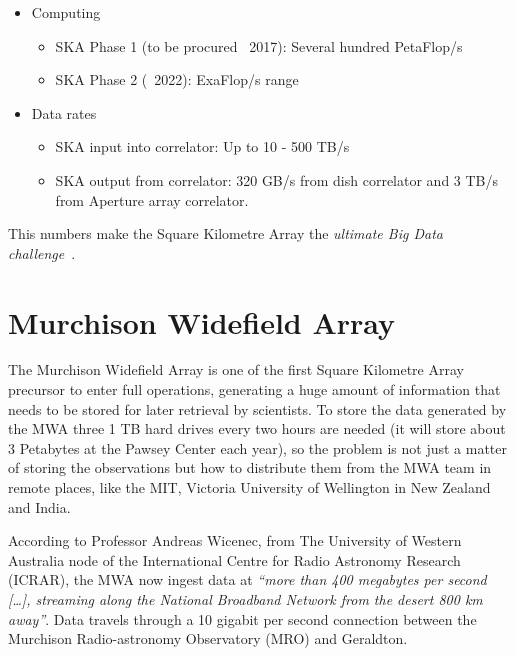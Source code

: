 \begin{itemize}


\item Computing

\begin{itemize}
\item SKA Phase 1 (to be procured ~2017): Several hundred PetaFlop/s
\item SKA Phase 2 (~2022): ExaFlop/s range
\end{itemize}


\item Data rates

\begin{itemize}
\item SKA input into correlator: Up to 10 - 500 TB/s
\item SKA output from correlator: 320 GB/s from dish correlator and 3 TB/s from Aperture array correlator.
\end{itemize}

\end{itemize}

This numbers make the Square Kilometre Array the \emph{ultimate Big Data challenge}~\cite{SKA_01,SKA_02}.




\section{Murchison Widefield Array} %
\label{sec:murchison_widefield_array}

The Murchison Widefield Array is
one of %
the first Square Kilometre Array precursor to enter full operations, generating a huge amount of information that needs to be stored for later retrieval by scientists. To store the data generated by the MWA three 1 TB hard drives every two hours are needed (it will store about 3 Petabytes at the Pawsey Center each year), so the
problem is not %
just a matter of storing the observations but how to distribute them from the MWA team in remote places, like
the MIT, %
Victoria University of Wellington in New Zealand and India. 

According to Professor Andreas Wicenec, from The University of Western Australia node of the International Centre for Radio Astronomy Research (ICRAR),
the MWA %
now ingest data at \emph{``more than 400 megabytes per second [\dots{}], streaming along the National Broadband Network from the desert 800 km away''}. Data travels through a 10 gigabit per second connection between the Murchison Radio-astronomy Observatory (MRO) and
Geraldton.


